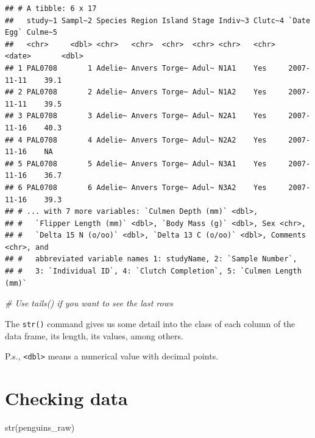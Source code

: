 \documentclass[
]{book}
\newenvironment{Shaded}{\begin{snugshade}}{\end{snugshade}}
\newcommand{\CommentTok}[1]{\textcolor[rgb]{0.56,0.35,0.01}{\textit{#1}}}
\newcommand{\FunctionTok}[1]{\textcolor[rgb]{0.00,0.00,0.00}{#1}}
\newcommand{\NormalTok}[1]{#1}
\begin{document}
\begin{verbatim}
## # A tibble: 6 x 17
##   study~1 Sampl~2 Species Region Island Stage Indiv~3 Clutc~4 `Date Egg` Culme~5
##   <chr>     <dbl> <chr>   <chr>  <chr>  <chr> <chr>   <chr>   <date>       <dbl>
## 1 PAL0708       1 Adelie~ Anvers Torge~ Adul~ N1A1    Yes     2007-11-11    39.1
## 2 PAL0708       2 Adelie~ Anvers Torge~ Adul~ N1A2    Yes     2007-11-11    39.5
## 3 PAL0708       3 Adelie~ Anvers Torge~ Adul~ N2A1    Yes     2007-11-16    40.3
## 4 PAL0708       4 Adelie~ Anvers Torge~ Adul~ N2A2    Yes     2007-11-16    NA  
## 5 PAL0708       5 Adelie~ Anvers Torge~ Adul~ N3A1    Yes     2007-11-16    36.7
## 6 PAL0708       6 Adelie~ Anvers Torge~ Adul~ N3A2    Yes     2007-11-16    39.3
## # ... with 7 more variables: `Culmen Depth (mm)` <dbl>,
## #   `Flipper Length (mm)` <dbl>, `Body Mass (g)` <dbl>, Sex <chr>,
## #   `Delta 15 N (o/oo)` <dbl>, `Delta 13 C (o/oo)` <dbl>, Comments <chr>, and
## #   abbreviated variable names 1: studyName, 2: `Sample Number`,
## #   3: `Individual ID`, 4: `Clutch Completion`, 5: `Culmen Length (mm)`
\end{verbatim}

\begin{Shaded}
\begin{Highlighting}[]
\CommentTok{\# Use tails() if you want to see the last rows}
\end{Highlighting}
\end{Shaded}

The \texttt{str()} command gives us some detail into the class of each column of the data frame, its length, its values, among others.

P.s., \texttt{\textless{}dbl\textgreater{}} means a numerical value with decimal points.

\hypertarget{checking-data}{%
\section{Checking data}\label{checking-data}}

\begin{Shaded}
\begin{Highlighting}[]
\FunctionTok{str}\NormalTok{(penguins\_raw)}
\end{Highlighting}
\end{Shaded}
\end{document}
